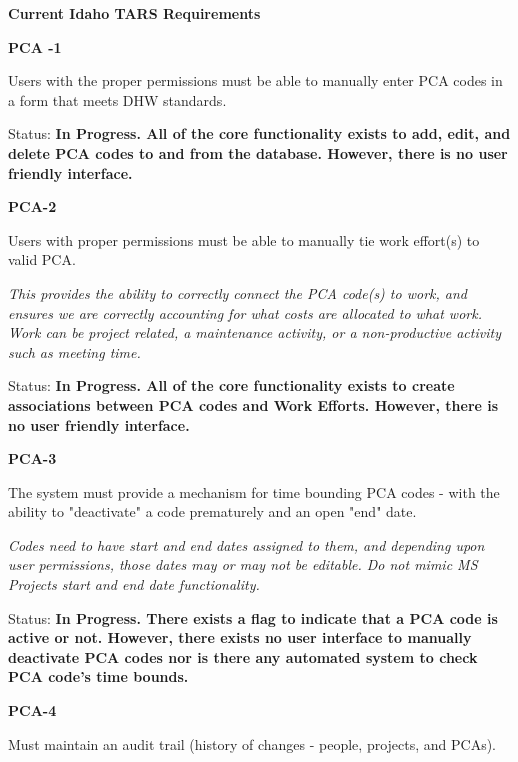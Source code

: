 \documentclass{article}
\begin{document}

\noindent \textbf{Current Idaho TARS Requirements}

\noindent 

\noindent \textbf{PCA -1}

\noindent Users with the proper permissions must be able to manually enter PCA codes in a form that meets DHW standards.

\noindent Status: \textbf{In Progress.  All of the core functionality exists to add, edit, and delete PCA codes to and from the database.  However, there is no user friendly interface.}

\noindent \textbf{}

\noindent \textbf{PCA-2}

\noindent Users with proper permissions must be able to manually tie work effort(s) to valid PCA.

\noindent \textit{This provides the ability to correctly connect the PCA code(s) to work, and ensures we are correctly accounting for what costs are allocated to what work. Work can be project related, a maintenance activity, or a non-productive activity such as meeting time.}

Status: \textbf{In Progress.  All of the core functionality exists to create associations between PCA codes and Work Efforts.  However, there is no user friendly interface.}



\noindent \textbf{PCA-3}

\noindent The system must provide a mechanism for time bounding PCA codes - with the ability to "deactivate" a code prematurely and an open "end" date.

\noindent \textit{Codes need to have start and end dates assigned to them, and depending upon user permissions, those dates may or may not be editable. Do not mimic MS Projects start and end date functionality.}

\noindent Status: \textbf{In Progress.  There exists a flag to indicate that a PCA code is active or not.  However, there exists no user interface to manually deactivate PCA codes nor is there any automated system to check PCA code's time bounds.}



\noindent \textbf{PCA-4}

\noindent Must maintain an audit trail (history of changes - people, projects, and PCAs).
\end{document}
